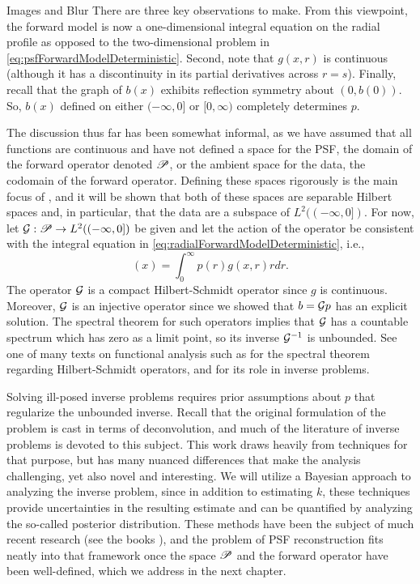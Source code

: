 \begin{chapter}{Images and Blur}
  There are three key observations to make.
  From this viewpoint, the forward model is now a one-dimensional integral equation on the radial profile as opposed to the two-dimensional problem in \eqref{eq:psfForwardModelDeterministic}.
  Second, note that $g(x,r)$ is continuous (although it has a discontinuity in its partial derivatives across $r=s$).
  Finally, recall that the graph of $b(x)$ exhibits reflection symmetry about $(0,b(0))$.
  So, $b(x)$ defined on either $(-\infty,0]$ or $[0,\infty)$ completely determines $p$.

  The discussion thus far has been somewhat informal, as we have assumed that all functions are continuous and have not defined a space for the PSF, the domain of the forward operator denoted $\mathscr P$, or the ambient space for the data, the codomain of the forward operator. %
  Defining these spaces rigorously is the main focus of , and it will be shown that both of these spaces are separable Hilbert spaces and, in particular, that the data are a subspace of $L^2((-\infty,0])$.
   For now, let $\mathcal G: \mathscr P \to L^2((-\infty,0])$ be given and let the action of the operator be consistent with the integral equation in \eqref{eq:radialForwardModelDeterministic}, i.e., 
  \begin{equation}
    [\G p](x) = \int_0^\infty p(r) g(x,r) r dr.
  \end{equation}
  The operator $\mathcal G$ is a compact Hilbert-Schmidt operator since $g$ is continuous.
  Moreover, $\mathcal G$ is an injective operator since we showed that $b = \mathcal G p$ has an explicit solution. 
  The spectral theorem for such operators implies that $\mathcal G$ has a countable spectrum which has zero as a limit point, so its inverse $\mathcal G^{-1}$ is unbounded. %
  See one of many texts on functional analysis such as \citep{bachman1966,rudin1991} for the spectral theorem regarding Hilbert-Schmidt operators, and \citep{tikhonov1963,vogel2002,morozov1993} for its role in inverse problems.

  Solving ill-posed inverse problems requires prior assumptions about $p$ that regularize the unbounded inverse.
  Recall that the original formulation of the problem is cast in terms of deconvolution, and much of the literature of inverse problems is devoted to this subject. 
  This work draws heavily from techniques for that purpose, but has many nuanced differences that make the analysis challenging, yet also novel and interesting.
  We will utilize a Bayesian approach to analyzing the inverse problem, since in addition to estimating $k$, these techniques provide uncertainties in the resulting estimate and can be quantified by analyzing the so-called posterior distribution.
  These methods have been the subject of much recent research (see the books \citep{calvetti2007introduction,kaipo2005,stuart2010}), and the problem of PSF reconstruction fits neatly into that framework once the space $\mathscr P$ and the forward operator have been well-defined, which we address in the next chapter.

\end{chapter}
